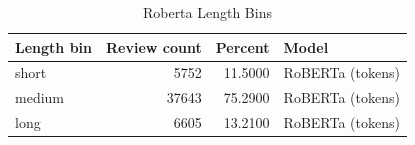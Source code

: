 \begin{table}
\caption{Roberta Length Bins}
\label{tab:roberta_length_bins}
\begin{tabular}{lrrl}
\toprule
Length bin & Review count & Percent & Model \\
\midrule
short & 5752 & 11.5000 & RoBERTa (tokens) \\
medium & 37643 & 75.2900 & RoBERTa (tokens) \\
long & 6605 & 13.2100 & RoBERTa (tokens) \\
\bottomrule
\end{tabular}
\end{table}
